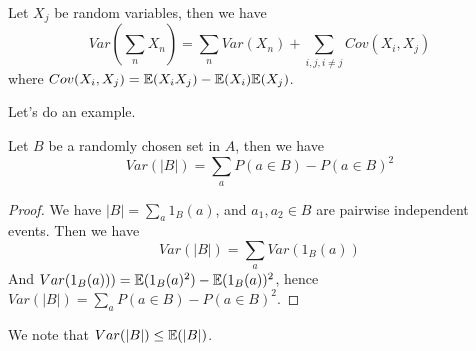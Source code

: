 \begin{lem}
    Let $X_j$ be random variables, then we have 
    \begin{equation*}
        Var\left(\sum_n X_n\right)=\sum_n Var(X_n)+\sum_{i,j, i\neq j}Cov(X_i, X_j)
    \end{equation*}
    where $Cov(X_i, X_j)=\mathbb{E}(X_iX_j)-\mathbb{E}(X_i)\mathbb{E}(X_j)$.
\end{lem}
Let's do an example.
\begin{example}
    Let $B$ be a randomly chosen set in $A$, then we have 
    \begin{equation*}
        Var(|B|)=\sum_a P(a\in B)-P(a\in B)^2
    \end{equation*}
\end{example}
\begin{proof}
    We have $|B|=\sum_a1_B(a)$, and $a_1, a_2\in B$ are pairwise independent events. Then we have 
    \begin{equation*}
        Var(|B|)=\sum_a Var(1_B(a))
    \end{equation*}
    And $Var(1_B(a)))=\mathbb{E}(1_B(a)^2)-\mathbb{E}(1_B(a))^2$, hence $Var(|B|)=\sum_a P(a\in B)-P(a\in B)^2$.
\end{proof}
We note that $Var(|B|)\leq\mathbb{E}(|B|)$.



